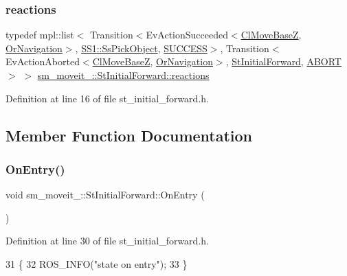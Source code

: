 \subsubsection{\texorpdfstring{reactions}{reactions}}
{\footnotesize\ttfamily typedef mpl\+::list$<$ Transition$<$Ev\+Action\+Succeeded$<$\hyperlink{classcl__move__base__z_1_1ClMoveBaseZ}{Cl\+Move\+BaseZ}, \hyperlink{classsm__moveit__2_1_1OrNavigation}{Or\+Navigation}$>$, \hyperlink{structsm__moveit__2_1_1SS1_1_1SsPickObject}{S\+S1\+::\+Ss\+Pick\+Object}, \hyperlink{classSUCCESS}{S\+U\+C\+C\+E\+SS}$>$, Transition$<$Ev\+Action\+Aborted$<$\hyperlink{classcl__move__base__z_1_1ClMoveBaseZ}{Cl\+Move\+BaseZ}, \hyperlink{classsm__moveit__2_1_1OrNavigation}{Or\+Navigation}$>$, \hyperlink{structsm__moveit__2_1_1StInitialForward}{St\+Initial\+Forward}, \hyperlink{classABORT}{A\+B\+O\+RT}$>$ $>$ \hyperlink{structsm__moveit__2_1_1StInitialForward_aa5b4642e5bbf910f5e52428b21dce093}{sm\+\_\+moveit\+\_\+::\+St\+Initial\+Forward\+::reactions}}



Definition at line 16 of file st\+\_\+initial\+\_\+forward.\+h.



\subsection{Member Function Documentation}
\mbox{\label{structsm__moveit__2_1_1StInitialForward_accda1809749bf1acc6d89ebf62a4c589}} 
\subsubsection{\texorpdfstring{On\+Entry()}{OnEntry()}}
{\footnotesize\ttfamily void sm\+\_\+moveit\+\_\+::\+St\+Initial\+Forward\+::\+On\+Entry (\begin{DoxyParamCaption}{ }\end{DoxyParamCaption})\hspace{0.3cm}{\ttfamily [inline]}}



Definition at line 30 of file st\+\_\+initial\+\_\+forward.\+h.


\begin{DoxyCode}
31     \{
32         ROS\_INFO(\textcolor{stringliteral}{"state on entry"});
33     \}
\end{DoxyCode}
\mbox{\label{structsm__moveit__2_1_1StInitialForward_acf69f723f0271f9ca550561ac2be5c0d}} 
